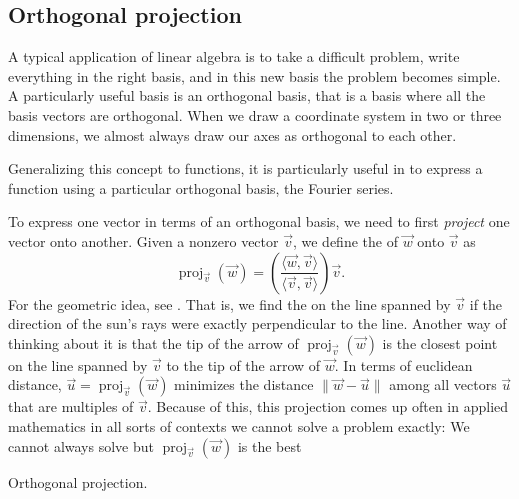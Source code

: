 \subsection{Orthogonal projection}

A typical application of linear algebra is to take a difficult problem,
write everything in the right basis, and in this new basis the problem
becomes simple.  A particularly useful basis is an orthogonal basis, that is
a basis where all the basis vectors are orthogonal.  When we draw a
coordinate system in two or three dimensions, we almost always draw our axes
as orthogonal to each other.

Generalizing this concept to functions,
it is particularly useful in  to express a
function using a particular orthogonal basis, the Fourier series.

To express one vector in terms of an orthogonal basis, we need to first
\emph{project} one vector onto another.
Given a nonzero vector $\vec{v}$, we define the
\emph{}
of $\vec{w}$ onto $\vec{v}$ as
\begin{equation*}
\operatorname{proj}_{\vec{v}}(\vec{w})
=
\left(
\frac{\langle \vec{w} , \vec{v} \rangle}{ \langle \vec{v} , \vec{v} \rangle}
\right)
\vec{v} .
\end{equation*}
For the geometric idea, see .  That is, we
find the  on the line spanned by $\vec{v}$ if the
direction of the sun's rays
were exactly perpendicular to the line. 
Another way of thinking about it is that the tip of the arrow of
$\operatorname{proj}_{\vec{v}}(\vec{w})$ is the closest point on the line
spanned by $\vec{v}$ to the tip of the arrow of $\vec{w}$.
In terms of euclidean distance, 
$\vec{u} = \operatorname{proj}_{\vec{v}}(\vec{w})$ minimizes the
distance
$\lVert \vec{w} - \vec{u} \rVert$ among all vectors $\vec{u}$ that are
multiples of $\vec{v}$.
Because of this, this projection comes up often in applied
mathematics in all sorts of contexts we cannot solve a problem
exactly: We cannot always solve
but $\operatorname{proj}_{\vec{v}}(\vec{w})$ is the best 

\begin{myfig}
\capstart
{}
\caption{Orthogonal projection.\label{vec-orthoproj:fig}}
\end{myfig}

